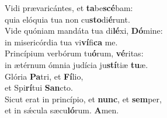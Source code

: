\evenverse Vidi prævaricántes, et \textbf{ta}be\textbf{scé}bam:~\*\\
\evenverse quia elóquia tua non cu\textbf{sto}di\textbf{é}runt.\\
\oddverse Vide quóniam mandáta tua di\textbf{lé}xi, \textbf{Dó}mine:~\*\\
\oddverse in misericórdia tua vi\textbf{ví}fi\textbf{ca} me.\\
\evenverse Princípium verbórum tu\textbf{ó}rum, \textbf{vé}ritas:~\*\\
\evenverse in ætérnum ómnia judícia ju\textbf{stí}tiæ \textbf{tu}æ.\\
\oddverse Glória \textbf{Pa}tri, et \textbf{Fí}lio,~\*\\
\oddverse et Spi\textbf{rí}tui \textbf{San}cto.\\
\evenverse Sicut erat in princípio, et \textbf{nunc}, et \textbf{sem}per,~\*\\
\evenverse et in sǽcula sæcu\textbf{ló}rum. \textbf{A}men.\\
